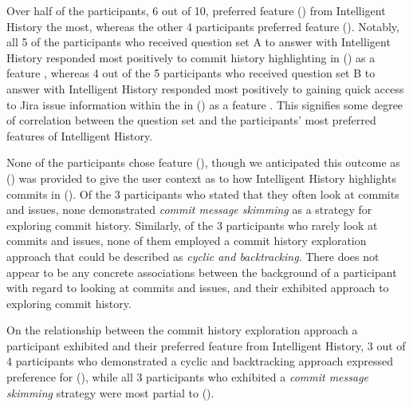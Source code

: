 Over half of the participants, 6 out of 10, preferred feature () from Intelligent History the most,
whereas the other 4 participants preferred feature ().
Notably, all 5 of the participants who received question set A to answer with Intelligent History 
responded most positively to commit history highlighting in () as a feature , 
whereas 4 out of the 5 participants who received question set B to answer with Intelligent History 
responded most positively to gaining quick access to Jira issue information within the  in () as a feature .
This signifies some degree of correlation between the question set and the participants' most preferred features of Intelligent History.

None of the participants chose feature (), though we anticipated this outcome as () 
was provided to give the user context as to how Intelligent History highlights commits in ().
Of the 3 participants who stated that they often look at commits and issues, none demonstrated \textit{commit message skimming} 
as a strategy for exploring commit history.
Similarly, of the 3 participants who rarely look at commits and issues, none of them employed a commit history exploration approach 
that could be described as \textit{cyclic and backtracking}.
There does not appear to be any concrete associations between the background of a participant with regard to looking at commits and issues,
and their exhibited approach to exploring commit history.

On the relationship between the commit history exploration approach a participant exhibited and their preferred feature from Intelligent History,
3 out of 4 participants who demonstrated a cyclic and backtracking approach expressed preference for (),
while all 3 participants who exhibited a \textit{commit message skimming} strategy were most partial to ().

